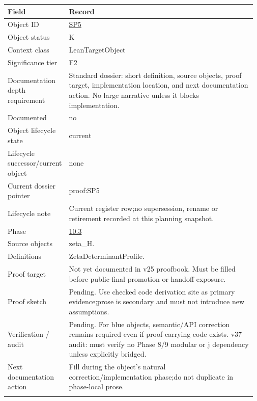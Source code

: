 \begin{longtable}{L{0.16\linewidth} L{0.81\linewidth}}
\hline
\textbf{Field} & \textbf{Record}\\
\hline
Object ID & \hyperlink{object-row-SP5}{SP5}\\
\hline\addlinespace[0.20em]
Object status & K\\
\hline\addlinespace[0.20em]
Context class & LeanTargetObject\\
\hline\addlinespace[0.20em]
Significance tier & F2\\
\hline\addlinespace[0.20em]
Documentation depth requirement & Standard dossier: short definition, source objects, proof target, implementation location, and next documentation action. No large narrative unless it blocks implementation.\\
\hline\addlinespace[0.20em]
Documented & no\\
\hline\addlinespace[0.20em]
Object lifecycle state & current\\
\hline\addlinespace[0.20em]
Lifecycle successor/\allowbreak{}current object & none\\
\hline\addlinespace[0.20em]
Current dossier pointer & proof:SP5\\
\hline\addlinespace[0.20em]
Lifecycle note & Current register row;\newline no supersession, rename or retirement recorded at this planning snapshot.\\
\hline\addlinespace[0.20em]
Phase & \hyperlink{phase-row-10-3}{10.3}\\
\hline\addlinespace[0.20em]
Source objects & zeta\_H.\\
\hline\addlinespace[0.20em]
Definitions & ZetaDeterminantProfile.\\
\hline\addlinespace[0.20em]
Proof target & Not yet documented in v25 proofbook. Must be filled before public-final promotion or handoff exposure.\\
\hline\addlinespace[0.20em]
Proof sketch & Pending. Use checked code derivation site as primary evidence;\newline prose is secondary and must not introduce new assumptions.\\
\hline\addlinespace[0.20em]
Verification /\allowbreak{} audit & Pending. For blue objects, semantic/\allowbreak{}API correction remains required even if proof-carrying code exists. v37 audit: must verify no Phase 8/\allowbreak{}9 modular or j dependency unless explicitly bridged.\\
\hline\addlinespace[0.20em]
Next documentation action & Fill during the object's natural correction/\allowbreak{}implementation phase;\newline do not duplicate in phase-local prose.\\
\hline\addlinespace[0.20em]
\end{longtable}
